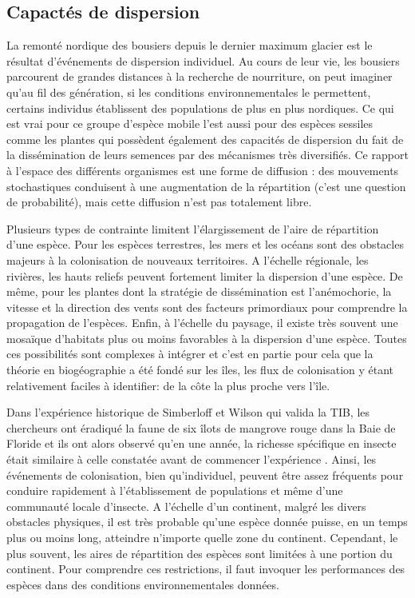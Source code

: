 \subsection*{Capactés de dispersion}\label{capactuxe9s-de-dispersion}

La remonté nordique des bousiers depuis le dernier maximum glacier est
le résultat d'événements de dispersion individuel. Au cours de leur vie,
les bousiers parcourent de grandes distances à la recherche de
nourriture, on peut imaginer qu'au fil des génération, si les conditions
environnementales le permettent, certains individus établissent des
populations de plus en plus nordiques. Ce qui est vrai pour ce groupe
d'espèce mobile l'est aussi pour des espèces sessiles comme les plantes
qui possèdent également des capacités de dispersion du fait de la
dissémination de leurs semences par des mécanismes très diversifiés. Ce
rapport à l'espace des différents organismes est une forme de diffusion
: des mouvements stochastiques conduisent à une augmentation de la
répartition (c'est une question de probabilité), mais cette diffusion
n'est pas totalement libre.

Plusieurs types de contrainte limitent l'élargissement de l'aire de
répartition d'une espèce. Pour les espèces terrestres, les mers et les
océans sont des obstacles majeurs à la colonisation de nouveaux
territoires. A l'échelle régionale, les rivières, les hauts reliefs
peuvent fortement limiter la dispersion d'une espèce. De même, pour les
plantes dont la stratégie de dissémination est l'anémochorie, la vitesse
et la direction des vents sont des facteurs primordiaux pour comprendre
la propagation de l'espèces. Enfin, à l'échelle du paysage, il existe
très souvent une mosaïque d'habitats plus ou moins favorables à la
dispersion d'une espèce. Toutes ces possibilités sont complexes à
intégrer et c'est en partie pour cela que la théorie en biogéographie a
été fondé sur les îles, les flux de colonisation y étant relativement
faciles à identifier: de la côte la plus proche vers l'île.

Dans l'expérience historique de Simberloff et Wilson qui valida la TIB,
les chercheurs ont éradiqué la faune de six îlots de mangrove rouge dans
la Baie de Floride et ils ont alors observé qu'en une année, la richesse
spécifique en insecte était similaire à celle constatée avant de
commencer l'expérience \citep{Simberloff1969a}. Ainsi, les événements de
colonisation, bien qu'individuel, peuvent être assez fréquents pour
conduire rapidement à l'établissement de populations et même d'une
communauté locale d'insecte. A l'échelle d'un continent, malgré les
divers obstacles physiques, il est très probable qu'une espèce donnée
puisse, en un temps plus ou moins long, atteindre n'importe quelle zone
du continent. Cependant, le plus souvent, les aires de répartition des
espèces sont limitées à une portion du continent. Pour comprendre ces
restrictions, il faut invoquer les performances des espèces dans des
conditions environnementales données.


